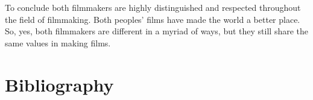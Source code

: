 \documentclass[
]{book}
\begin{document}
To conclude both filmmakers are highly distinguished and respected throughout the field of filmmaking. Both peoples' films have made the world a better place. So, yes, both filmmakers are different in a myriad of ways, but they still share the same values in making films.

\hypertarget{bibliography}{%
\section{Bibliography}\label{bibliography}}

\backmatter
\end{document}
